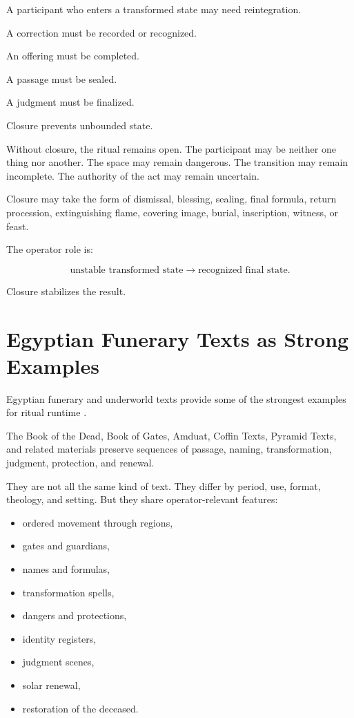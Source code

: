 \documentclass[11pt]{book}
\begin{document}
A participant who enters a transformed state may need reintegration.

A correction must be recorded or recognized.

An offering must be completed.

A passage must be sealed.

A judgment must be finalized.

Closure prevents unbounded state.

Without closure, the ritual remains open. The participant may be neither one thing nor another. The space may remain dangerous. The transition may remain incomplete. The authority of the act may remain uncertain.

Closure may take the form of dismissal, blessing, sealing, final formula, return procession, extinguishing flame, covering image, burial, inscription, witness, or feast.

The operator role is:

\[
\text{unstable transformed state} \rightarrow \text{recognized final state}.
\]

Closure stabilizes the result.

\section{Egyptian Funerary Texts as Strong Examples}

Egyptian funerary and underworld texts provide some of the strongest examples for ritual runtime \cite{Allen1974BookDead,Faulkner1972BookDead,Hornung1999BooksAfterlife,Assmann2005DeathSalvation}.

The Book of the Dead, Book of Gates, Amduat, Coffin Texts, Pyramid Texts, and related materials preserve sequences of passage, naming, transformation, judgment, protection, and renewal.

They are not all the same kind of text. They differ by period, use, format, theology, and setting. But they share operator-relevant features:

\begin{itemize}
    \item ordered movement through regions,
    \item gates and guardians,
    \item names and formulas,
    \item transformation spells,
    \item dangers and protections,
    \item identity registers,
    \item judgment scenes,
    \item solar renewal,
    \item restoration of the deceased.
\end{itemize}
\end{document}
